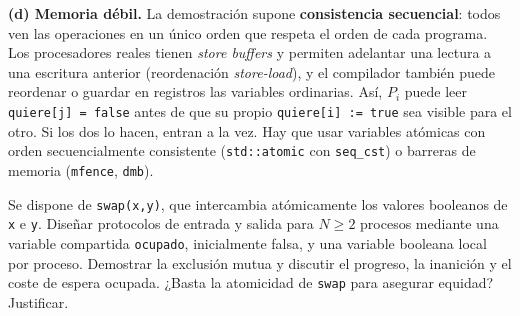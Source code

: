\begin{solucion}
\textbf{(d) Memoria débil.} La demostración supone \textbf{consistencia secuencial}: todos ven las operaciones en un
único orden que respeta el orden de cada programa. Los procesadores reales tienen \emph{store buffers} y permiten
adelantar una lectura a una escritura anterior (reordenación \emph{store-load}), y el compilador también puede
reordenar o guardar en registros las variables ordinarias. Así, $P_i$ puede leer \texttt{quiere[j] = false} antes de
que su propio \texttt{quiere[i] := true} sea visible para el otro. Si los dos lo hacen, entran a la vez. Hay que usar
variables atómicas con orden secuencialmente consistente (\texttt{std::atomic} con \texttt{seq\_cst}) o barreras
de memoria (\texttt{mfence}, \texttt{dmb}).
\end{solucion}

\begin{ejercicio}
Se dispone de \texttt{swap(x,y)}, que intercambia atómicamente los valores booleanos de \texttt{x} e \texttt{y}.
Diseñar protocolos de entrada y salida para $N \ge 2$ procesos mediante una variable compartida \texttt{ocupado},
inicialmente falsa, y una variable booleana local por proceso. Demostrar la exclusión mutua y discutir el
progreso, la inanición y el coste de espera ocupada. ¿Basta la atomicidad de \texttt{swap} para asegurar equidad?
Justificar.
\end{ejercicio}
